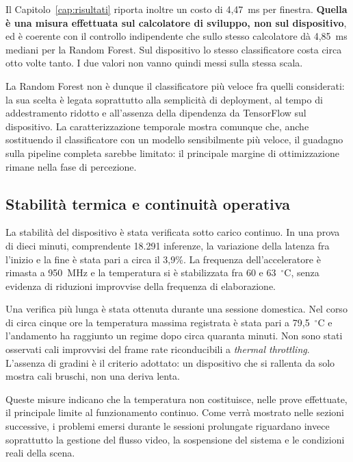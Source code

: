 Il Capitolo~\ref{cap:risultati} riporta inoltre un costo di 4,47~ms per finestra. \textbf{Quella è una misura effettuata sul calcolatore di sviluppo, non sul dispositivo}, ed è coerente con il controllo indipendente che sullo stesso calcolatore dà 4,85~ms mediani per la Random Forest. Sul dispositivo lo stesso classificatore costa circa otto volte tanto. I due valori non vanno quindi messi sulla stessa scala.

La Random Forest non è dunque il classificatore più veloce fra quelli considerati: la sua scelta è legata soprattutto alla semplicità di deployment, al tempo di addestramento ridotto e all'assenza della dipendenza da TensorFlow sul dispositivo. La caratterizzazione temporale mostra comunque che, anche sostituendo il classificatore con un modello sensibilmente più veloce, il guadagno sulla pipeline completa sarebbe limitato: il principale margine di ottimizzazione rimane nella fase di percezione.

\subsection{Stabilità termica e continuità operativa}
\label{sec:termico}

La stabilità del dispositivo è stata verificata sotto carico continuo. In una prova di dieci minuti, comprendente 18.291 inferenze, la variazione della latenza fra l'inizio e la fine è stata pari a circa il 3,9\%. La frequenza dell'acceleratore è rimasta a 950~MHz e la temperatura si è stabilizzata fra 60 e 63~$^\circ$C, senza evidenza di riduzioni improvvise della frequenza di elaborazione.

Una verifica più lunga è stata ottenuta durante una sessione domestica. Nel corso di circa cinque ore la temperatura massima registrata è stata pari a 79,5~$^\circ$C e l'andamento ha raggiunto un regime dopo circa quaranta minuti. Non sono stati osservati cali improvvisi del frame rate riconducibili a \emph{thermal throttling}. L'assenza di gradini è il criterio adottato: un dispositivo che si rallenta da solo mostra cali bruschi, non una deriva lenta.

Queste misure indicano che la temperatura non costituisce, nelle prove effettuate, il principale limite al funzionamento continuo. Come verrà mostrato nelle sezioni successive, i problemi emersi durante le sessioni prolungate riguardano invece soprattutto la gestione del flusso video, la sospensione del sistema e le condizioni reali della scena.

\bigskip

